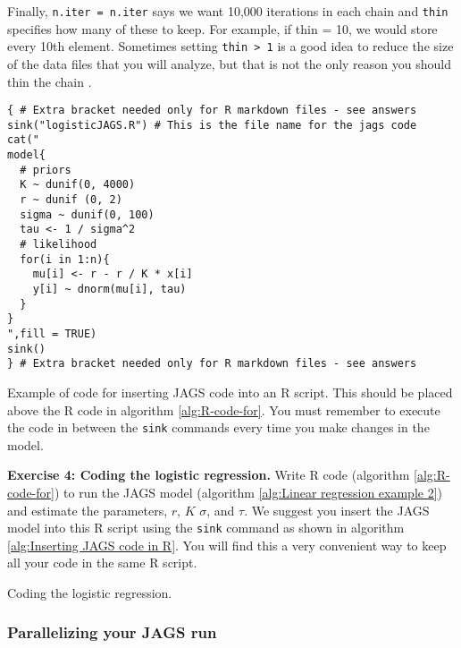 \documentclass[12pt,english]{article}
\begin{document}
Finally, \texttt{n.iter = n.iter} says we want 10,000 iterations in each chain and \texttt{thin} specifies how many of these to keep. For example, if thin = 10, we would store every 10th element. Sometimes setting \texttt{thin > 1} is a good idea to reduce the size of the data files that you will analyze, but that is not the only reason you should thin the chain \citep{Link:2012ve}.

\begin{algorithm}
\begin{Verbatim}[frame=single]
{ # Extra bracket needed only for R markdown files - see answers
sink("logisticJAGS.R") # This is the file name for the jags code
cat("
model{
  # priors
  K ~ dunif(0, 4000)
  r ~ dunif (0, 2)
  sigma ~ dunif(0, 100) 
  tau <- 1 / sigma^2
  # likelihood
  for(i in 1:n){
    mu[i] <- r - r / K * x[i]
    y[i] ~ dnorm(mu[i], tau)
  }
}  
",fill = TRUE)
sink()
} # Extra bracket needed only for R markdown files - see answers
\end{Verbatim}
\caption[Example of code for inserting JAGS code within R script]{Example of code for inserting JAGS code into an R script. This should be placed above the R code in algorithm \ref{alg:R-code-for}. You must remember to execute the code in between the \texttt{sink} commands every time you make changes in the model.}
\label{alg:Inserting JAGS code in R}
\end{algorithm}

\belowcaptionskip=-40pt
\begin{exercise}
\begin{mdframed}
\doublespacing
\textbf{Exercise 4: Coding the logistic regression.} Write R code (algorithm \ref{alg:R-code-for}) to run the JAGS model (algorithm \ref{alg:Linear regression example 2}) and estimate the parameters, $r$, $K$ $\sigma$, and $\tau$. We suggest you insert the JAGS model into this R script using the \texttt{sink} command as shown in algorithm \ref{alg:Inserting JAGS code in R}. You will find this a very convenient way to keep all your code in the same R script. 
\end{mdframed}
\captionsetup{textformat=empty, labelformat=empty}
\caption[Coding the logistic regression]{Coding the logistic regression.}
\label{ex:logistic regression sequential}
\end{exercise}
\belowcaptionskip=0pt

\subsubsection{Parallelizing your JAGS run}
\end{document}
